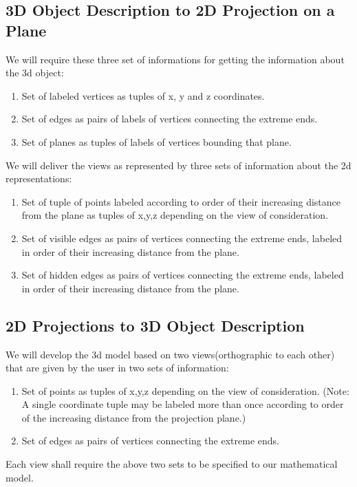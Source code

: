 \documentclass[12pt]{report}
\begin{document}
\subsection*{3D Object Description to 2D Projection on a Plane}
We will require these three set of informations for getting the information about the 3d object:
\begin{enumerate}
\item Set of labeled vertices as tuples of x, y and z coordinates.
\item Set of edges as pairs of labels of vertices connecting the extreme ends.
\item Set of planes as tuples of labels of vertices bounding that plane.
\end{enumerate}
We will deliver the views as represented by three sets of information about the 2d representations:
\begin{enumerate}
\item Set of tuple of points labeled according to order of their increasing distance from the plane as tuples of x,y,z depending on the view of consideration.
\item Set of visible edges as pairs of vertices connecting the extreme ends, labeled in order of their increasing distance from the plane. 
\item Set of hidden edges as pairs of vertices connecting the extreme ends, labeled in order of their increasing distance from the plane.
\end{enumerate}


\subsection*{2D Projections to 3D Object Description}
We will develop the 3d model based on two views(orthographic to each other) that are given by the user in two sets of information:
\begin{enumerate}
\item Set of points as tuples of x,y,z depending on the view of consideration. (Note: A single coordinate tuple may be labeled more than once according to order of the increasing distance from the projection plane.)
\item Set of edges as pairs of vertices connecting the extreme ends.
\end{enumerate}
Each view shall require the above two sets to be specified to our mathematical model.
\end{document}
